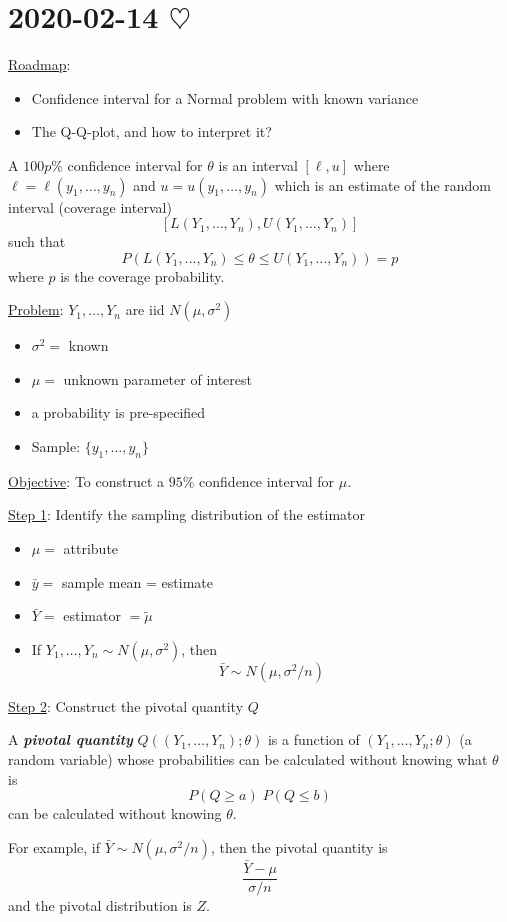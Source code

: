 \section{2020-02-14 \texorpdfstring{$\heartsuit$}{[Valentine's Day!]}}

\underline{Roadmap}:
\begin{itemize}
    \item Confidence interval for a Normal problem with known variance
    \item The Q-Q-plot, and how to interpret it?
\end{itemize}
\begin{defbox}
    \begin{definition}
        A $ 100p\% $ confidence interval for $ \theta $ is an interval $
            [\ell,u] $ where $ \ell=\ell(y_1,\ldots ,y_n) $ and $ u=u(y_1,\ldots
            ,y_n) $ which is an estimate of the random interval (coverage interval)
        \[ \left[ L(Y_1,\ldots ,Y_n),U(Y_1,\ldots ,Y_n) \right] \] such that
        \[ P\left( L(Y_1,\ldots ,Y_n)\leqslant \theta\leqslant U(Y_1,\ldots
            ,Y_n) \right)=p \] where $ p $ is the coverage probability.
    \end{definition}
\end{defbox}
\underline{Problem}:  $ Y_1,\ldots ,Y_n $ are iid $ N(\mu,\sigma^2) $
\begin{itemize}
    \item $ \sigma^2= $ known
    \item $ \mu= $ unknown parameter of interest
    \item a probability is pre-specified
    \item Sample: $ \{y_1,\ldots ,y_n\} $
\end{itemize}
\underline{Objective}: To construct a $ 95\% $ confidence interval for $ \mu $.

\underline{Step 1}: Identify the sampling distribution of the estimator
\begin{itemize}
    \item $ \mu= $ attribute
    \item $ \bar{y}= $ sample mean = estimate
    \item $ \bar{Y}= $ estimator $ = \tilde{\mu} $
    \item If $ Y_1,\ldots ,Y_n \sim N(\mu,\sigma^2) $, then
          \[ \bar{Y} \sim N\left( \mu,\sigma^2/n \right) \]
\end{itemize}
\underline{Step 2}: Construct the pivotal quantity $ Q $
\begin{defbox}
    \begin{definition}
        A \textbf{\emph{pivotal quantity}} $ Q((Y_1,\ldots ,Y_n);\theta) $ is a
        function of $ \left( Y_1,\ldots ,Y_n;\theta \right) $ (a random
        variable) whose probabilities can be calculated without knowing what $
            \theta $ is
        \[ P(Q\geqslant a)\; P(Q\leqslant b) \] can be calculated without
        knowing $ \theta $.
    \end{definition}
\end{defbox}
For example, if $ \bar{Y} \sim N(\mu,\sigma^2/n) $, then the pivotal
quantity is
\[ \frac{\bar{Y}-\mu}{\sigma/n} \] and the pivotal distribution is $ Z $.

